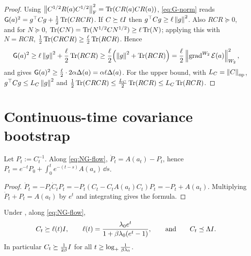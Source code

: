 \begin{proof}
Using $\left\lVert C^{1/2}R(a)C^{1/2}\right\rVert_{\mathrm{F}}^2=\operatorname{Tr}(CR(a)CR(a))$, \eqref{eq:G-norm} reads
$\mathsf{G}(a)^2=g^\top Cg+\tfrac12\operatorname{Tr}(CRCR)$. If $C\succeq\ell I$ then
$g^\top Cg\geq\ell\left\lVert g\right\rVert^2$. Also $R CR\succeq0$, and for $N\succeq0$,
$\operatorname{Tr}(CN)=\operatorname{Tr}(N^{1/2}CN^{1/2})\geq\ell\operatorname{Tr}(N)$; applying this with $N=RCR$,
$\tfrac12\operatorname{Tr}(CRCR)\geq\tfrac\ell2\operatorname{Tr}(RCR)$. Hence
\[
    \mathsf{G}(a)^2\geq\ell\left\lVert g\right\rVert^2+\frac\ell2\operatorname{Tr}(RCR)
    \geq\frac\ell2\Bigl(\left\lVert g\right\rVert^2+\operatorname{Tr}(RCR)\Bigr)
    =\frac\ell2\left\lVert \operatorname{grad}^{W_2}\mathcal{E}(a)\right\rVert_{W_2}^2 ,
\]
and  gives $\mathsf{G}(a)^2\geq\tfrac\ell2\cdot2\alpha\Delta(a)=\alpha\ell\Delta(a)$.
For the upper bound, with $L_C=\left\lVert C\right\rVert_{\mathrm{op}}$, $g^\top Cg\leq L_C\left\lVert g\right\rVert^2$ and
$\tfrac12\operatorname{Tr}(CRCR)\leq\tfrac{L_C}2\operatorname{Tr}(RCR)\leq L_C\operatorname{Tr}(RCR)$.
\end{proof}

\section{Continuous-time covariance bootstrap}
\label{sec:cont}

\begin{lemma}
\label{lem:precision-duhamel}
Let $P_t:=C_t^{-1}$. Along \eqref{eq:NG-flow},
$\dot P_t=A(a_t)-P_t$, hence $P_t=e^{-t}P_0+\int_0^te^{-(t-s)}A(a_s)\,\dd s$.
\end{lemma}

\begin{proof}
$\dot P_t=-P_t\dot C_tP_t=-P_t(C_t-C_tA(a_t)C_t)P_t=-P_t+A(a_t)$. Multiplying
$\dot P_t+P_t=A(a_t)$ by $e^t$ and integrating gives the formula.
\end{proof}

\begin{lemma}
\label{lem:cont-cov}
Under , along \eqref{eq:NG-flow},
\begin{equation}
\label{eq:ell-t}
    C_t\succeq\ell(t)I,
    \qquad
    \ell(t)=\frac{\lambda_0e^t}{1+\beta\lambda_0(e^t-1)},
    \qquad\text{and}\qquad
    C_t\preceq\Lambda I .
\end{equation}
In particular $C_t\succeq\tfrac1{2\beta}I$ for all $t\geq\log_+\frac1{\beta\lambda_0}$.
\end{lemma}

